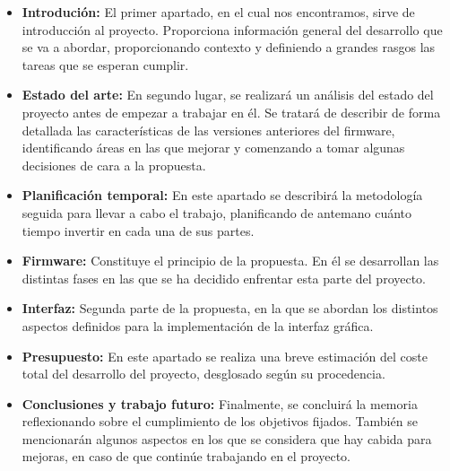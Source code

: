 \begin{itemize}
    \item\textbf{Introdución:} El primer apartado, en el cual nos encontramos, sirve de introducción al proyecto. Proporciona información general del desarrollo que se va a abordar, proporcionando contexto y definiendo a grandes rasgos las tareas que se esperan cumplir.
    \item\textbf{Estado del arte:} En segundo lugar, se realizará un análisis del estado del proyecto antes de empezar a trabajar en él. Se tratará de describir de forma detallada las características de las versiones anteriores del firmware, identificando áreas en las que mejorar y comenzando a tomar algunas decisiones de cara a la propuesta.
    \item\textbf{Planificación temporal:} En este apartado se describirá la metodología seguida para llevar a cabo el trabajo, planificando de antemano cuánto tiempo invertir en cada una de sus partes.
    \item\textbf{Firmware:} Constituye el principio de la propuesta. En él se desarrollan las distintas fases en las que se ha decidido enfrentar esta parte del proyecto.
    \item\textbf{Interfaz:} Segunda parte de la propuesta, en la que se abordan los distintos aspectos definidos para la implementación de la interfaz gráfica.
    \item\textbf{Presupuesto:} En este apartado se realiza una breve estimación del coste total del desarrollo del proyecto, desglosado según su procedencia.
    \item\textbf{Conclusiones y trabajo futuro:} Finalmente, se concluirá la memoria reflexionando sobre el cumplimiento de los objetivos fijados. También se mencionarán algunos aspectos en los que se considera que hay cabida para mejoras, en caso de que continúe trabajando en el proyecto.
\end{itemize}

